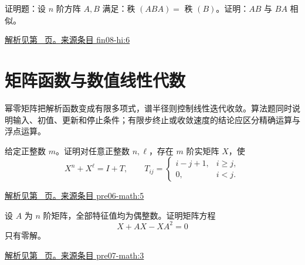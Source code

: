 \documentclass[UTF8,12pt,a4paper,fontset=fandol]{ctexart}
\begin{document}
\begin{example}\label{ex:fin08-hi:6}

证明题：设 $n$ 阶方阵 $A,B$ 满足：秩 $\left(ABA\right)=$ 秩 $\left(B\right)$。证明：$AB$ 与 $BA$ 相似。

\par\hyperref[ans:fin08-hi:6]{解析见第~\pageref{ans:fin08-hi:6} 页。}\quad\href{https://github.com/lzxcr/cmc-mathematics/blob/64916fa1fdbc3e444a652eca204d5669058ee321/src/problems/finals/08/06.md}{来源条目 fin08-hi:6}

\end{example}

\section{矩阵函数与数值线性代数}

\label{sec:questions-10}

幂零矩阵把解析函数变成有限多项式，谱半径则控制线性迭代收敛。算法题同时说明输入、初值、更新和停止条件；有限步终止或收敛速度的结论应区分精确运算与浮点运算。

\begin{example}\label{ex:pre06-math:5}

给定正整数 $m$。证明对任意正整数 $n,\ell$，存在 $m$ 阶实矩阵 $X$，使
\[
X^n+X^\ell=I+T,\qquad
T_{ij}=\begin{cases}i-j+1,&i\ge j,\\0,&i<j.\end{cases}
\]

\par\hyperref[ans:pre06-math:5]{解析见第~\pageref{ans:pre06-math:5} 页。}\quad\href{https://github.com/lzxcr/cmc-mathematics/blob/64916fa1fdbc3e444a652eca204d5669058ee321/src/problems/preliminary/06/05.md}{来源条目 pre06-math:5}

\end{example}

\begin{example}\label{ex:pre07-math:3}

设 $A$ 为 $n$ 阶矩阵，全部特征值均为偶整数。证明矩阵方程
\[
X+AX-XA^2=0
\]
只有零解。

\par\hyperref[ans:pre07-math:3]{解析见第~\pageref{ans:pre07-math:3} 页。}\quad\href{https://github.com/lzxcr/cmc-mathematics/blob/64916fa1fdbc3e444a652eca204d5669058ee321/src/problems/preliminary/07/03.md}{来源条目 pre07-math:3}

\end{example}
\end{document}
